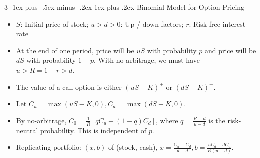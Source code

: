 \documentclass[10pt, landscape]{article}
\makeatletter
\renewcommand{\subsection}{\@startsection{subsection}{3}{0mm}%
                                {-1ex plus -.5ex minus -.2ex}%
                                {1ex plus .2ex}%
                                {\normalfont\small\bfseries}}%
\makeatother
\begin{document}
\begin{multicols*}{3}
\subsection{Binomial Model for Option Pricing}
\begin{itemize}
    \item $S$: Initial price of stock; $u>d>0$: Up / down factors; $r$: Risk free interest rate
    \item At the end of one period, price will be $uS$ with probability $p$ and price will be $dS$ with probability $1-p$. With no-arbitrage, we must have $u>R=1+r>d$.
    \item The value of a call option is either $(uS-K)^+$ or $(dS-K)^+$.
    \item Let $C_u=\max(uS-K,0), C_d=\max(dS-K,0)$.
    \item By no-arbitrage, $C_0=\frac{1}{R}[qC_u+(1-q)C_d]$, where $q=\frac{R-d}{u-d}$ is the risk-neutral probability. This is independent of $p$.
    \item Replicating portfolio: $(x,b)$ of (stock, cash), $x=\frac{C_u-C_d}{u-d}, b = \frac{uC_d-dC_u}{R(u-d)}$.
\end{itemize}

\end{multicols*}
\end{document}
